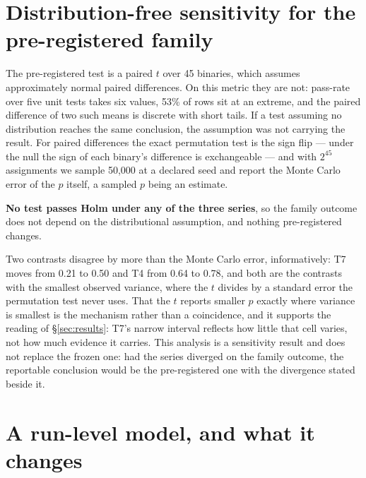 \appendix
\section{Distribution-free sensitivity for the pre-registered family}
\label{sec:appendice-permutazione}

The pre-registered test is a paired $t$ over 45 binaries, which assumes approximately normal paired
differences. On this metric they are not: pass-rate over five unit tests takes six values, 53\% of rows
sit at an extreme, and the paired difference of two such means is discrete with short tails. If a test
assuming no distribution reaches the same conclusion, the assumption was not carrying the result. For
paired differences the exact permutation test is the sign flip --- under the null the sign of each
binary's difference is exchangeable --- and with $2^{45}$ assignments we sample 50{,}000 at a declared
seed and report the Monte Carlo error of the $p$ itself, a sampled $p$ being an estimate.



\textbf{No test passes Holm under any of the three series}, so the family outcome does not depend on the
distributional assumption, and nothing pre-registered changes.

Two contrasts disagree by more than the Monte Carlo error, informatively: T7 moves from 0.21 to 0.50 and
T4 from 0.64 to 0.78, and both are the contrasts with the smallest observed variance, where the $t$
divides by a standard error the permutation test never uses. That the $t$ reports smaller $p$ exactly
where variance is smallest is the mechanism rather than a coincidence, and it supports the reading of
\S\ref{sec:results}: T7's narrow interval reflects how little that cell varies, not how much evidence it
carries. This analysis is a sensitivity
result and does not replace the frozen one: had the series diverged on the family outcome, the reportable
conclusion would be the pre-registered one with the divergence stated beside it.

\section{A run-level model, and what it changes}
\label{sec:appendice-glmm}

